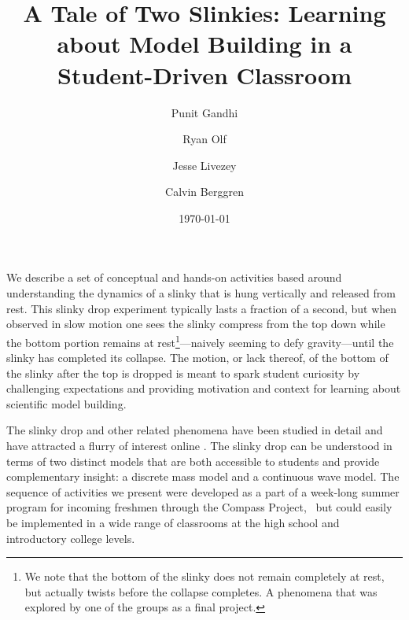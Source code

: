 \documentclass[pre,preprint,superscriptaddress,longbibliography]{revtex4-1}
\begin{document}
\title{A Tale of Two Slinkies: Learning about Model Building in a Student-Driven Classroom}
\author{Punit  Gandhi}
\author{Ryan Olf}
\author{Jesse Livezey}
\author{Calvin Berggren}
\date{\today}

\maketitle

We describe a set of conceptual  and hands-on activities based around understanding the dynamics of a slinky that is hung vertically and released from rest.  
This slinky drop experiment typically lasts a fraction of a second, but when observed in slow motion one sees the slinky compress from the top down while the bottom portion remains at rest\footnote{We note that the bottom of the slinky does not remain completely at rest, but actually twists before the collapse completes.  A phenomena that was explored by one of the groups as a final project.}---naively seeming to defy gravity---until the slinky has completed its collapse.  The motion, or lack thereof, of the bottom of the slinky after the top is dropped is meant to spark student curiosity by challenging  expectations and providing motivation and context for learning about scientific model building. 



The slinky drop  and other related phenomena have been studied in detail\cite{calkin1993, newburgh1995, graham2001, aguirregabiria2007,unruh2011, cross2012} and have attracted a flurry of interest online \cite{..}. The slinky drop  can be understood in terms of two distinct models that are both accessible to students and provide complementary insight: a discrete mass model and a continuous wave model.  
 The sequence of activities we present were developed as a part of a week-long summer program for incoming freshmen through the Compass Project,~\cite{albana2013,Roth2012,drdf2013a,drdf2013b,gandhi2014} but could easily be implemented in a wide range of classrooms at the high school and introductory college levels.   %
\end{document}
